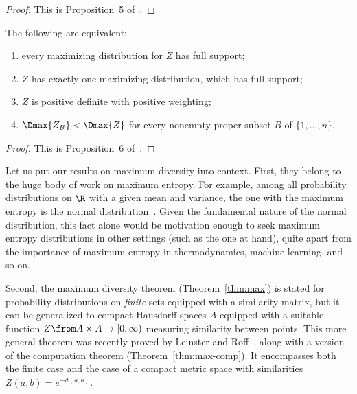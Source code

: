 \begin{proof}
This is Proposition~5 of~\cite{MDBB}.
\end{proof}


\begin{propn}
The following are equivalent:
% 
\begin{enumerate}
\item
{}
every maximizing distribution for $Z$ has full support;

\item
{}
$Z$ has exactly one maximizing distribution, which has full support;

\item
{}
$Z$ is positive definite with positive weighting;

\item 
{}
$\Dmax{Z_B} < \Dmax{Z}$ for every nonempty proper subset $B$ of $\{1,
  \ldots, n\}$.
\end{enumerate}
\end{propn}

\begin{proof}
This is Proposition~6 of~\cite{MDBB}.
\end{proof}

Let us put our results on maximum diversity into context.  First, they
belong to the huge body of work on maximum entropy.  For example,
among all probability distributions on $\R$ with a given mean and variance,
the one with the maximum%
% 
% 
entropy is the normal%
%
% 
distribution~\cite{LinnITP,BarrECL}.  Given the
fundamental nature of the normal distribution, this fact alone would
be motivation enough to seek maximum entropy distributions in other
settings (such as the one at hand), quite apart from the importance of
maximum entropy in thermodynamics, machine learning, and so on.

Second, the maximum diversity theorem (Theorem~\ref{thm:max}) is stated for
probability distributions on \emph{finite} sets equipped with a similarity
matrix, but it can be generalized to compact Hausdorff spaces $A$ equipped
with a suitable function $Z \from A \times A \to [0, \infty)$ measuring
similarity between points.  This more general theorem was recently proved
by Leinster and Roff~\cite{MEMS},%
%
%
%
%
along with a version of the computation theorem
(Theorem~\ref{thm:max-comp}).  It encompasses both the finite case and the
case of a compact metric space with similarities $Z(a, b) = e^{-d(a, b)}$.

